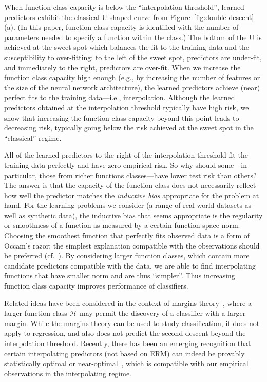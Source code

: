 \documentclass[11pt]{article}
\newcommand{\cH}{{\mathcal{H}}}
\begin{document}
When function class capacity is below the ``interpolation threshold'', learned predictors exhibit the classical U-shaped curve from Figure~\ref{fig:double-descent}(a).
(In this paper, function class capacity is identified with the number of parameters needed to specify a function within the class.)
The bottom of the U is achieved at the sweet spot which balances the fit to the training data and the susceptibility to over-fitting:
to the left of the sweet spot, predictors are under-fit, and immediately to the right, predictors are over-fit.
When we increase the function class capacity high enough (e.g., by increasing the number of features or the size of the neural network architecture), the learned predictors achieve (near) perfect fits to the training data---i.e., interpolation.
Although the learned predictors obtained at the interpolation threshold typically have high risk, we show that increasing the function class capacity beyond this point leads to decreasing risk, typically going below the risk achieved at the sweet spot in the ``classical'' regime.

All of the learned predictors  to the right of the interpolation threshold fit the training data perfectly and have zero empirical risk.
So why should some---in particular, those from richer functions classes---have lower test risk than others?
The answer is that the capacity of the function class does not necessarily reflect how well the predictor matches the \emph{inductive bias} appropriate for the problem at hand.
For the learning problems we consider (a range of real-world datasets as well as synthetic data), the inductive bias that seems appropriate  is the regularity or smoothness of a function as measured by a certain function space norm.
Choosing the smoothest function that perfectly fits observed data is a form of Occam's razor: the simplest explanation compatible with the observations should be preferred (cf.~\cite{Vapnik,blumer1987occam}).
By considering larger function classes, which contain more candidate predictors compatible with the data, we are able to find interpolating functions that have smaller norm and are thus ``simpler''. 
Thus increasing function class capacity improves performance of classifiers.

Related ideas have been considered in the context of margins theory~\cite{Vapnik,bartlett1998sample,schapire1998}, where a larger function class $\cH$ may permit the discovery of a classifier with a larger margin.
While the margins theory can be used to study classification, it does not apply to regression, and also does not predict the second descent beyond the interpolation threshold.
Recently, there has been an emerging recognition that certain interpolating predictors (not based on ERM) can indeed be provably statistically optimal or near-optimal~\cite{belkin2018overfitting,belkin2018does}, which is compatible with our empirical observations in the interpolating regime.
\end{document}
